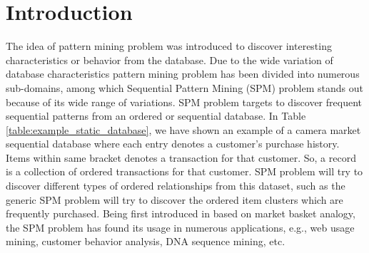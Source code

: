 \section{Introduction}\label{sec:introduction}




% 
% 
% 
% 
The idea of pattern mining problem was introduced to discover interesting characteristics or behavior from the database. Due to the wide variation of database characteristics pattern mining problem has been divided into numerous sub-domains, among which Sequential Pattern Mining (SPM) problem stands out because of its wide range of variations. SPM problem targets to discover frequent sequential patterns from an ordered or sequential database. In Table \ref{table:example_static_database}, we have shown an example of a camera market sequential database where each entry denotes a customer's purchase history. Items within same bracket denotes a transaction for that customer. So, a record is a collection of ordered transactions for that customer. SPM problem will try to discover different types of ordered relationships from this dataset, such as the generic SPM problem will try to discover the ordered item clusters which are frequently purchased. Being first introduced in \cite{srikant1996mining} based on market basket analogy, the SPM problem has found its usage in numerous applications, e.g., web usage mining, customer behavior analysis, DNA sequence mining, etc.

